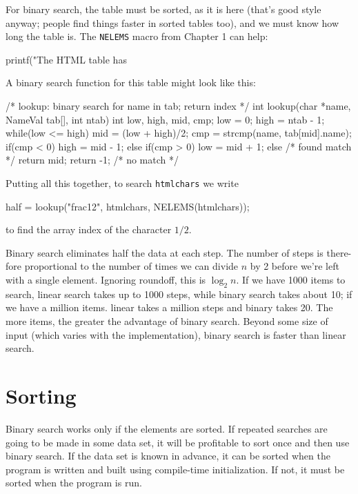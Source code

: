 For binary search, the table must be sorted, as it is here (that's good
style anyway; people find things faster in sorted tables too), and we must
know how long the table is. The \verb'NELEMS' macro from Chapter 1 can
help:
\begin{wellcode}
    printf("The HTML table has %
\end{wellcode}

A binary search function for this table might look like this:
\begin{wellcode}
    /* lookup: binary search for name in tab; return index */
    int lookup(char *name, NameVal tab[], int ntab)
    {
        int low, high, mid, cmp;
        low = 0;
        high = ntab - 1;
        while(low <= high){
            mid = (low + high)/2;
            cmp = strcmp(name, tab[mid].name);
            if(cmp < 0){
                high = mid - 1;
            }
            else if(cmp > 0){
                low = mid + 1;
            }
            else{   /* found match */
                return mid;
            }
        }
        return -1;  /* no match */
    }
\end{wellcode}

Putting all this together, to search \verb'htmlchars' we write
\begin{wellcode}
    half = lookup("frac12", htmlchars, NELEMS(htmlchars));
\end{wellcode}
to find the array index of the character $1/2$.

Binary search eliminates half the data at each step. The number of steps is
there- fore proportional to the number of times we can divide $n$ by 2
before we're left with a single element. Ignoring roundoff, this is $\log_2
n$. If we have 1000 items to search, linear search takes up to 1000 steps,
while binary search takes about 10; if we have a million items. linear
takes a million steps and binary takes 20. The more items, the greater the
advantage of binary search. Beyond some size of input (which varies with
the implementation), binary search is faster than linear search.

\section{Sorting}
Binary search works only if the elements are sorted. If repeated searches
are going to be made in some data set, it will be profitable to sort once
and then use binary search. If the data set is known in advance, it can be
sorted when the program is written and built using compile-time
initialization. If not, it must be sorted when the program is run.

